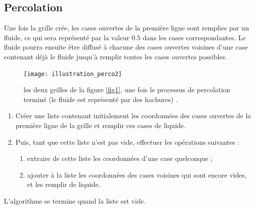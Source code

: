 %
\subsection*{Percolation}\label{percolation}
%




Une fois la grille crée, les cases ouvertes de la première ligne sont
remplies par un fluide, ce qui sera représenté par la valeur $0.5$ dans
les cases correspondantes. Le fluide pourra ensuite être diffusé à
chacune des cases ouvertes voisines d'une case contenant déjà le fluide jusqu'à remplir toutes les cases ouvertes possibles.


\begin{figure}[!htb]
\begin{center}
\texttt{[image: illustration\_perco2]}
\caption{les deux grilles de la figure \ref{fig1}, une fois le processus de percolation terminé (le fluide est représenté par des hachures) \label{fig2}.}
\end{center}
\end{figure}

\begin{enumerate}
\item
  Créer une liste contenant initialement les coordonnées des cases
  ouvertes de la première ligne de la grille et remplir ces cases de
  liquide.
\item
  Puis, tant que cette liste n'est pas vide, effectuer les opérations suivantes :
  \begin{enumerate}
  \item extraire de cette liste les coordonnées d'une case quelconque ;
 \item ajouter à la liste les coordonnées des cases voisines qui sont encore
vides, et les remplir de liquide.
  \end{enumerate}
\end{enumerate}


L'algorithme se termine quand la liste est vide.







